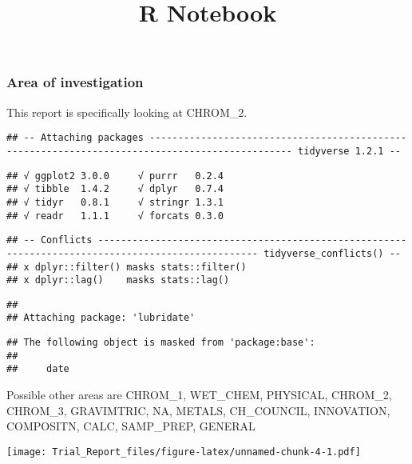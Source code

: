 \documentclass[]{article}
\title{R Notebook}
\author{}
\date{}
\newenvironment{Shaded}{\begin{snugshade}}{\end{snugshade}}
\newcommand{\KeywordTok}[1]{\textcolor[rgb]{0.13,0.29,0.53}{\textbf{#1}}}
\newcommand{\DataTypeTok}[1]{\textcolor[rgb]{0.13,0.29,0.53}{#1}}
\newcommand{\DecValTok}[1]{\textcolor[rgb]{0.00,0.00,0.81}{#1}}
\newcommand{\OperatorTok}[1]{\textcolor[rgb]{0.81,0.36,0.00}{\textbf{#1}}}
\newcommand{\NormalTok}[1]{#1}
\begin{document}
\maketitle

\subsubsection{Area of investigation}\label{area-of-investigation}

This report is specifically looking at CHROM\_2.

\begin{verbatim}
## -- Attaching packages ----------------------------------------------------------------------------------------------- tidyverse 1.2.1 --
\end{verbatim}

\begin{verbatim}
## √ ggplot2 3.0.0     √ purrr   0.2.4
## √ tibble  1.4.2     √ dplyr   0.7.4
## √ tidyr   0.8.1     √ stringr 1.3.1
## √ readr   1.1.1     √ forcats 0.3.0
\end{verbatim}

\begin{verbatim}
## -- Conflicts -------------------------------------------------------------------------------------------------- tidyverse_conflicts() --
## x dplyr::filter() masks stats::filter()
## x dplyr::lag()    masks stats::lag()
\end{verbatim}

\begin{verbatim}
## 
## Attaching package: 'lubridate'
\end{verbatim}

\begin{verbatim}
## The following object is masked from 'package:base':
## 
##     date
\end{verbatim}

Possible other areas are CHROM\_1, WET\_CHEM, PHYSICAL, CHROM\_2,
CHROM\_3, GRAVIMTRIC, NA, METALS, CH\_COUNCIL, INNOVATION, COMPOSITN,
CALC, SAMP\_PREP, GENERAL

\begin{Shaded}
\end{Shaded}

\texttt{[image: Trial\_Report\_files/figure-latex/unnamed-chunk-4-1.pdf]}
\end{document}
